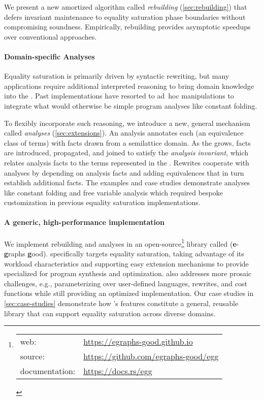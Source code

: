 We present a new amortized algorithm
  called \textit{rebuilding} (\autoref{sec:rebuilding})
  that defers \egraph invariant maintenance
  to equality saturation phase boundaries without compromising soundness.
Empirically, rebuilding provides asymptotic speedups
  over conventional approaches.

\paragraph{Domain-specific Analyses}

Equality saturation is primarily driven by syntactic rewriting,
  but many applications require additional interpreted reasoning
  to bring domain knowledge into the \egraph.
Past implementations have resorted to
  ad~hoc \egraph manipulations
  to integrate what would otherwise be
  simple program analyses like constant folding.

To flexibly incorporate such reasoning,
  we introduce a new, general mechanism called \textit{\eclass analyses}
  (\autoref{sec:extensions}).
An \eclass analysis annotates each \eclass
  (an equivalence class of terms)
  with facts drawn from a semilattice domain.
As the \egraph grows,
  facts are introduced, propagated, and joined
  to satisfy the \textit{\eclass analysis invariant},
  which relates analysis facts to the terms represented in the \egraph.
Rewrites cooperate with \eclass analyses by
  depending on analysis facts and
  adding equivalences that in turn
  establish additional facts.
The examples and case studies
  demonstrate \eclass analyses like
  constant folding and free variable analysis
  which required bespoke customization in
  previous equality saturation implementations.

\paragraph{A generic, high-performance implementation}

We implement rebuilding and \eclass analyses in
  an open-source\footnote{
    \begin{tabular}[t]{ll}
      web: & \url{https://egraphs-good.github.io}\\
      source: & \url{https://github.com/egraphs-good/egg}\\
      documentation: & \url{https://docs.rs/egg}
    \end{tabular}
  }
  library called \egg (\textbf{e}-\textbf{g}raphs \textbf{g}ood).
\Egg specifically targets equality saturation,
  taking advantage of its workload characteristics and
  supporting easy extension mechanisms to
  provide \egraphs specialized for
  program synthesis and optimization.
\Egg also addresses more prosaic challenges,
  e.g., parameterizing over user-defined
  languages, rewrites, and cost functions
  while still providing an optimized implementation.
Our case studies in \autoref{sec:case-studies}
 demonstrate how \egg's features
 constitute a general, reusable \egraph library that can
 support equality saturation across diverse domains.

